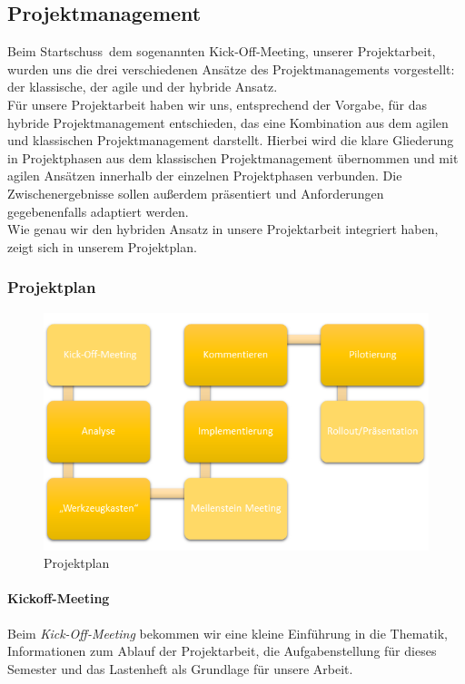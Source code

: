 \documentclass[12pt,a4paper]{article}
\begin{document}
\subsection{Projektmanagement}
Beim \dq Startschuss\dq \, dem sogenannten Kick-Off-Meeting, unserer Projektarbeit, wurden uns die drei verschiedenen Ansätze des Projektmanagements vorgestellt: der klassische, der agile und der hybride Ansatz.\\
Für unsere Projektarbeit haben wir uns, entsprechend der Vorgabe, für das hybride Projektmanagement entschieden, das eine Kombination aus dem agilen und klassischen Projektmanagement darstellt. Hierbei wird die klare Gliederung in Projektphasen aus dem klassischen Projektmanagement übernommen und mit agilen Ansätzen innerhalb der einzelnen Projektphasen verbunden. Die Zwischenergebnisse sollen außerdem präsentiert und Anforderungen gegebenenfalls adaptiert werden. \\
Wie genau wir den hybriden Ansatz in unsere Projektarbeit integriert haben, zeigt sich in unserem Projektplan.

\subsubsection{Projektplan}
\begin{figure}[!htbp]
\advance\rightskip-1cm
	\includegraphics[scale=1.25]{Projektablauf.png}
	\caption{Projektplan}
	\label{img:Projektplan}
\end{figure}

\paragraph{Kickoff-Meeting}
Beim \textit{Kick-Off-Meeting} bekommen wir eine kleine  Einführung in die Thematik, Informationen zum Ablauf der Projektarbeit, die Aufgabenstellung für dieses Semester und das Lastenheft als Grundlage für unsere Arbeit.
\end{document}
